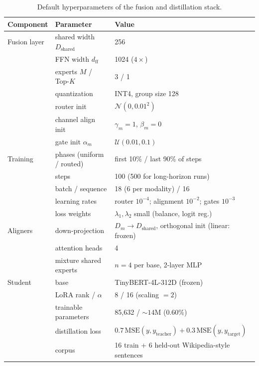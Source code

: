 \documentclass[10pt,twoside]{article}
\theoremstyle{definition}
\begin{document}
\begin{table}[h]
\centering
\caption{Default hyperparameters of the fusion and distillation stack.}
\begin{tabular}{lll}
\toprule
\textbf{Component} & \textbf{Parameter} & \textbf{Value} \\
\midrule
Fusion layer & shared width $D_{\text{shared}}$ & 256 \\
 & FFN width $d_{\text{ff}}$ & 1024 ($4\times$) \\
 & experts $M$ / Top-$K$ & 3 / 1 \\
 & quantization & INT4, group size 128 \\
 & router init & $\mathcal{N}(0, 0.01^2)$ \\
 & channel align init & $\gamma_m = 1$, $\beta_m = 0$ \\
 & gate init $\alpha_m$ & $\mathcal{U}(0.01, 0.1)$ \\
\midrule
Training & phases (uniform / routed) & first 10\% / last 90\% of steps \\
 & steps & 100 (500 for long-horizon runs) \\
 & batch / sequence & 18 (6 per modality) / 16 \\
 & learning rates & router $10^{-4}$; alignment $10^{-2}$; gates $10^{-3}$ \\
 & loss weights & $\lambda_1, \lambda_2$ small (balance, logit reg.) \\
\midrule
Aligners & down-projection & $D_m \rightarrow D_{\text{shared}}$, orthogonal init (linear: frozen) \\
 & attention heads & 4 \\
 & mixture shared experts & $n = 4$ per base, 2-layer MLP \\
\midrule
Student & base & TinyBERT-4L-312D (frozen) \\
 & LoRA rank / $\alpha$ & 8 / 16 (scaling $= 2$) \\
 & trainable parameters & 85{,}632 / ${\sim}14$M ($0.60\%$) \\
 & distillation loss & $0.7\,\mathrm{MSE}(y, y_{\text{teacher}}) + 0.3\,\mathrm{MSE}(y, y_{\text{target}})$ \\
 & corpus & 16 train + 6 held-out Wikipedia-style sentences \\
\bottomrule
\end{tabular}
\end{table}
\end{document}

